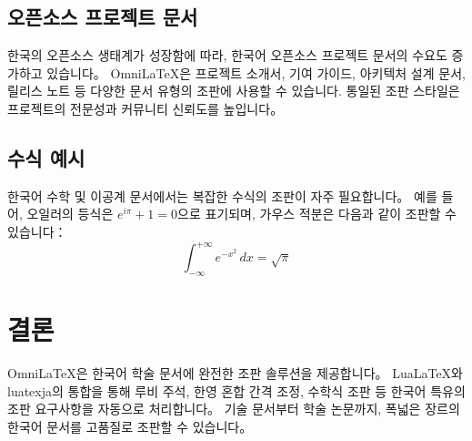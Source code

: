 \documentclass[
    language=korean,
    doctype=article,
    institution=none,
]{../../omnilatex}
\begin{document}
\subsection{오픈소스 프로젝트 문서}
한국의 오픈소스 생태계가 성장함에 따라, 한국어 오픈소스 프로젝트 문서의 수요도 증가하고 있습니다。 OmniLaTeX은 프로젝트 소개서, 기여 가이드, 아키텍처 설계 문서, 릴리스 노트 등 다양한 문서 유형의 조판에 사용할 수 있습니다. 통일된 조판 스타일은 프로젝트의 전문성과 커뮤니티 신뢰도를 높입니다。

\subsection{수식 예시}
한국어 수학 및 이공계 문서에서는 복잡한 수식의 조판이 자주 필요합니다。 예를 들어, 오일러의 등식은 $e^{i\pi} + 1 = 0$으로 표기되며, 가우스 적분은 다음과 같이 조판할 수 있습니다：
\[
\int_{-\infty}^{+\infty} e^{-x^2} \, dx = \sqrt{\pi}
\]

\section{결론}
OmniLaTeX은 한국어 학술 문서에 완전한 조판 솔루션을 제공합니다。 LuaLaTeX와 luatexja의 통합을 통해 루비 주석, 한영 혼합 간격 조정, 수학식 조판 등 한국어 특유의 조판 요구사항을 자동으로 처리합니다。 기술 문서부터 학술 논문까지, 폭넓은 장르의 한국어 문서를 고품질로 조판할 수 있습니다。
\end{document}
